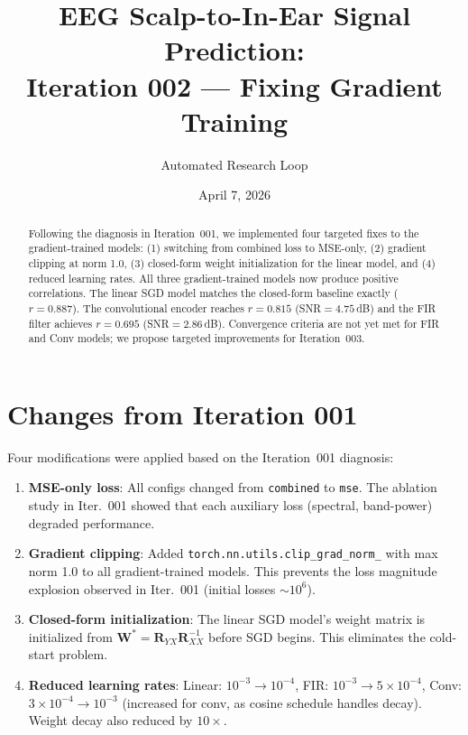 \documentclass[11pt,a4paper]{article}
\title{EEG Scalp-to-In-Ear Signal Prediction:\\
  Iteration 002 --- Fixing Gradient Training}
\author{Automated Research Loop}
\date{April 7, 2026}
\begin{document}
\maketitle

\begin{abstract}
Following the diagnosis in Iteration~001, we implemented four targeted fixes to
the gradient-trained models: (1) switching from combined loss to MSE-only,
(2) gradient clipping at norm 1.0, (3) closed-form weight initialization for the
linear model, and (4) reduced learning rates. All three gradient-trained models
now produce positive correlations. The linear SGD model matches the closed-form
baseline exactly ($r=0.887$). The convolutional encoder reaches $r=0.815$
(SNR$=4.75$\,dB) and the FIR filter achieves $r=0.695$ (SNR$=2.86$\,dB).
Convergence criteria are not yet met for FIR and Conv models; we propose
targeted improvements for Iteration~003.
\end{abstract}

\section{Changes from Iteration 001}

Four modifications were applied based on the Iteration~001 diagnosis:

\begin{enumerate}
  \item \textbf{MSE-only loss}: All configs changed from \texttt{combined} to
    \texttt{mse}. The ablation study in Iter.~001 showed that each auxiliary
    loss (spectral, band-power) degraded performance.

  \item \textbf{Gradient clipping}: Added \texttt{torch.nn.utils.clip\_grad\_norm\_}
    with max norm 1.0 to all gradient-trained models. This prevents the loss
    magnitude explosion observed in Iter.~001 (initial losses $\sim 10^6$).

  \item \textbf{Closed-form initialization}: The linear SGD model's weight
    matrix is initialized from $\mathbf{W}^* = \mathbf{R}_{YX}\mathbf{R}_{XX}^{-1}$
    before SGD begins. This eliminates the cold-start problem.

  \item \textbf{Reduced learning rates}: Linear: $10^{-3} \to 10^{-4}$,
    FIR: $10^{-3} \to 5 \times 10^{-4}$, Conv: $3 \times 10^{-4} \to 10^{-3}$
    (increased for conv, as cosine schedule handles decay). Weight decay also
    reduced by $10\times$.
\end{enumerate}
\end{document}
